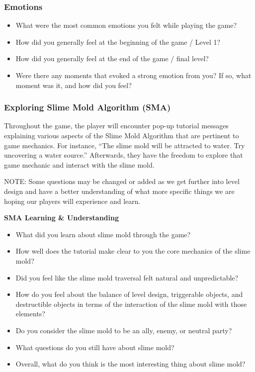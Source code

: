 \documentclass[12pt, titlepage]{article}
\begin{document}
\subsubsection{Emotions}

\begin{itemize}
  \item What were the most common emotions you felt while playing the game?
  \item How did you generally feel at the beginning of the game / Level 1?
  \item How did you generally feel at the end of the game / final level?
  \item Were there any moments that evoked a strong emotion from you? If so, what moment was it, and how did you feel?
\end{itemize}

\subsubsection{Exploring Slime Mold Algorithm (SMA)}

Throughout the game, the player will encounter pop-up tutorial messages explaining various aspects of the Slime Mold Algorithm that are pertinent to game mechanics. For instance, ``The slime mold will be attracted to water. Try uncovering a water source.'' Afterwards, they have the freedom to explore that game mechanic and interact with the slime mold.

NOTE: Some questions may be changed or added as we get further into level design and have a better understanding of what more specific things we are hoping our players will experience and learn.

\textbf{SMA Learning \& Understanding}

\begin{itemize}
  \item What did you learn about slime mold through the game?
  \item How well does the tutorial make clear to you the core mechanics of the slime mold?
  \item Did you feel like the slime mold traversal felt natural and unpredictable?
  \item How do you feel about the balance of level design, triggerable objects, and destructible objects in terms of the interaction of the slime mold with those elements?
  \item Do you consider the slime mold to be an ally, enemy, or neutral party?
  \item What questions do you still have about slime mold?
  \item Overall, what do you think is the most interesting thing about slime mold?
\end{itemize}
\end{document}
